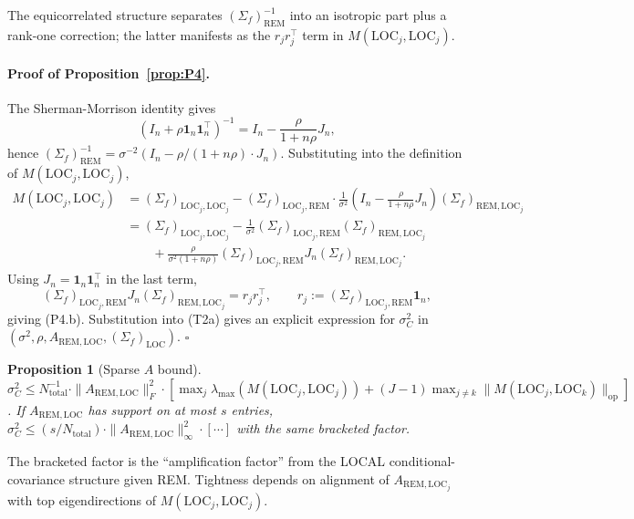 \documentclass[11pt,letterpaper]{article}
\newtheorem{proposition}{Proposition}
\theoremstyle{remark}
\newcommand{\REM}{\mathrm{REM}}
\newcommand{\LOC}{\mathrm{LOC}}
\newcommand{\Sigmaf}{\Sigma_f}
\newcommand{\Ntot}{N_{\mathrm{total}}}
\newcommand{\sigC}{\sigma^2_C}
\begin{document}
The equicorrelated structure separates $(\Sigmaf)_\REM^{-1}$ into an isotropic part plus a rank-one correction; the latter manifests as the $r_j r_j^\top$ term in $M(\LOC_j, \LOC_j)$.

\paragraph{Proof of Proposition~\ref{prop:P4}.} The Sherman-Morrison identity gives
\begin{equation*}
(I_n + \rho \mathbf{1}_n \mathbf{1}_n^\top)^{-1} = I_n - \frac{\rho}{1 + n \rho} J_n,
\end{equation*}
hence $(\Sigmaf)_\REM^{-1} = \sigma^{-2} (I_n - \rho/(1 + n \rho) \cdot J_n)$. Substituting into the definition of $M(\LOC_j, \LOC_j)$,
\begin{align*}
M(\LOC_j, \LOC_j)
&= (\Sigmaf)_{\LOC_j, \LOC_j} - (\Sigmaf)_{\LOC_j, \REM} \cdot \tfrac{1}{\sigma^2}\!\left(I_n - \tfrac{\rho}{1+n\rho} J_n\right) (\Sigmaf)_{\REM, \LOC_j} \\
&= (\Sigmaf)_{\LOC_j, \LOC_j} - \tfrac{1}{\sigma^2} (\Sigmaf)_{\LOC_j, \REM} (\Sigmaf)_{\REM, \LOC_j} \\
&\qquad + \tfrac{\rho}{\sigma^2 (1 + n \rho)} (\Sigmaf)_{\LOC_j, \REM} J_n (\Sigmaf)_{\REM, \LOC_j}.
\end{align*}
Using $J_n = \mathbf{1}_n \mathbf{1}_n^\top$ in the last term,
\begin{equation*}
(\Sigmaf)_{\LOC_j, \REM} J_n (\Sigmaf)_{\REM, \LOC_j} = r_j r_j^\top, \qquad r_j := (\Sigmaf)_{\LOC_j, \REM} \mathbf{1}_n,
\end{equation*}
giving (P4.b). Substitution into (T2a) gives an explicit expression for $\sigC$ in $(\sigma^2, \rho, A_{\REM, \LOC}, (\Sigmaf)_\LOC)$. $\square$

\begin{proposition}[Sparse $A$ bound]\label{prop:P5}
$\sigma^2_C \le \Ntot^{-1} \cdot \|A_{\REM, \LOC}\|_F^2 \cdot [\max_j \lambda_{\max}(M(\LOC_j, \LOC_j)) + (J - 1) \max_{j \ne k} \|M(\LOC_j, \LOC_k)\|_{\mathrm{op}}]$. If $A_{\REM, \LOC}$ has support on at most $s$ entries, $\sigma^2_C \le (s/\Ntot) \cdot \|A_{\REM, \LOC}\|_\infty^2 \cdot [\cdots]$ with the same bracketed factor.
\end{proposition}

The bracketed factor is the ``amplification factor'' from the LOCAL conditional-covariance structure given REM. Tightness depends on alignment of $A_{\REM, \LOC_j}$ with top eigendirections of $M(\LOC_j, \LOC_j)$.
\end{document}
